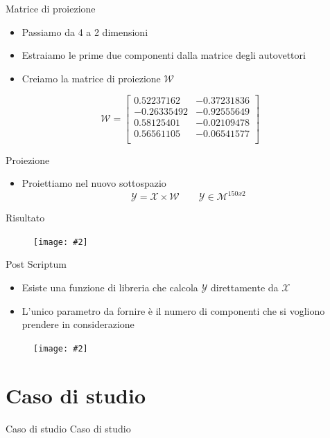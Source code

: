 \documentclass[xcolor={dvipsnames}]{beamer}%
\newcommand{\codice}[2]{}
\newcommand{\figcen}[2]{
	\begin{figure}
		\begin{center}
			\texttt{[image: \#2]}
		\end{center}
	\end{figure}
}
\begin{document}
		\begin{frame}{Matrice di proiezione}
			\begin{itemize}
				\item Passiamo da 4 a 2 dimensioni
				\item Estraiamo le prime due componenti dalla matrice degli autovettori
			\end{itemize}
			\codice{125}{127}
			\begin{itemize}
				\item Creiamo la matrice di proiezione $\mathcal{W}$
			\end{itemize}
			$$\mathcal{W} = \begin{bmatrix}
			0.52237162 & -0.37231836\\
			-0.26335492 & -0.92555649\\
			0.58125401 & -0.02109478\\
			0.56561105 & -0.06541577\\
			\end{bmatrix}$$
		\end{frame}
	
		\begin{frame}{Proiezione}
			\begin{itemize}
				\item Proiettiamo nel nuovo sottospazio $$\mathcal{Y} = \mathcal{X}\times \mathcal{W} \qquad \mathcal{Y} \in \mathcal{M}^{150x2}$$
			\end{itemize}
			\codice{132}{133}
		\end{frame}
	
		\begin{frame}{Risultato}
			\figcen{.8\textwidth}{PCA}
		\end{frame}
	
		\begin{frame}{Post Scriptum}
			\begin{itemize}
				\item Esiste una funzione di libreria che calcola $\mathcal{Y}$ direttamente da $\mathcal{X}$
				\item L'unico parametro da fornire è il numero di componenti che si vogliono prendere in considerazione
			\end{itemize}
			\codice{149}{151}
			\figcen{.3\textwidth}{ok}
		\end{frame}

\section{Caso di studio}
	\begin{frame}{Caso di studio}
		Caso di studio
	\end{frame}
\end{document}
